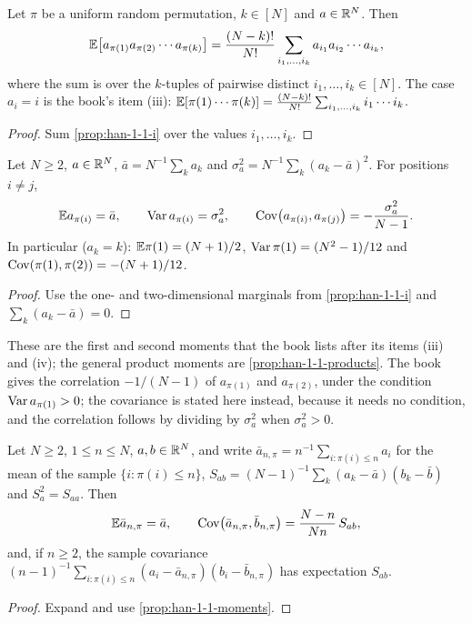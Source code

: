 \begin{proposition}
  \label{prop:han-1-1-products}
  Let $\pi$ be a uniform random permutation, $k\in[N]$ and $a\in\mathbb{R}^N$. Then
  \[
    \mathbb{E}\bigl[a_{\pi(1)}a_{\pi(2)}\cdots a_{\pi(k)}\bigr]=\frac{(N-k)!}{N!}\sum_{i_1,\dots,i_k}a_{i_1}a_{i_2}\cdots a_{i_k},
  \]
  where the sum is over the $k$-tuples of pairwise distinct $i_1,\dots,i_k\in[N]$. The case $a_i=i$ is the book's item (iii): $\mathbb{E}[\pi(1)\cdots\pi(k)]=\frac{(N-k)!}{N!}\sum_{i_1,\dots,i_k}i_1\cdots i_k$.
\end{proposition}
\begin{proof}
  Sum \cref{prop:han-1-1-i} over the values $i_1,\dots,i_k$.
\end{proof}

\begin{proposition}
  \label{prop:han-1-1-moments}
  Let $N\ge2$, $a\in\mathbb{R}^N$, $\bar a=N^{-1}\sum_ka_k$ and $\sigma_a^2=N^{-1}\sum_k(a_k-\bar a)^2$. For positions $i\ne j$,
  \[
    \mathbb{E} a_{\pi(i)}=\bar a,\qquad \operatorname{Var} a_{\pi(i)}=\sigma_a^2,\qquad \operatorname{Cov}\bigl(a_{\pi(i)},a_{\pi(j)}\bigr)=-\frac{\sigma_a^2}{N-1}.
  \]
  In particular ($a_k=k$): $\mathbb{E}\pi(1)=(N+1)/2$, $\operatorname{Var}\pi(1)=(N^2-1)/12$ and $\operatorname{Cov}(\pi(1),\pi(2))=-(N+1)/12$.
\end{proposition}
\begin{proof}
  Use the one- and two-dimensional marginals from \cref{prop:han-1-1-i} and $\sum_k(a_k-\bar a)=0$.
\end{proof}
\begin{remark}
  These are the first and second moments that the book lists after its items (iii) and (iv); the general product moments are \cref{prop:han-1-1-products}. The book gives the correlation $-1/(N-1)$ of $a_{\pi(1)}$ and $a_{\pi(2)}$, under the condition $\operatorname{Var} a_{\pi(1)}>0$; the covariance is stated here instead, because it needs no condition, and the correlation follows by dividing by $\sigma_a^2$ when $\sigma_a^2>0$.
\end{remark}

\begin{proposition}
  \label{prop:han-1-1-sampling}
  Let $N\ge2$, $1\le n\le N$, $a,b\in\mathbb{R}^N$, and write $\bar a_{n,\pi}=n^{-1}\sum_{i:\pi(i)\le n}a_i$ for the mean of the sample $\{i:\pi(i)\le n\}$, $S_{ab}=(N-1)^{-1}\sum_k(a_k-\bar a)(b_k-\bar b)$ and $S_a^2=S_{aa}$. Then
  \[
    \mathbb{E}\bar a_{n,\pi}=\bar a,\qquad
    \operatorname{Cov}\bigl(\bar a_{n,\pi},\bar b_{n,\pi}\bigr)=\frac{N-n}{Nn}\,S_{ab},
  \]
  and, if $n\ge2$, the sample covariance $(n-1)^{-1}\sum_{i:\pi(i)\le n}(a_i-\bar a_{n,\pi})(b_i-\bar b_{n,\pi})$ has expectation $S_{ab}$.
\end{proposition}
\begin{proof}
  Expand and use \cref{prop:han-1-1-moments}.
\end{proof}

